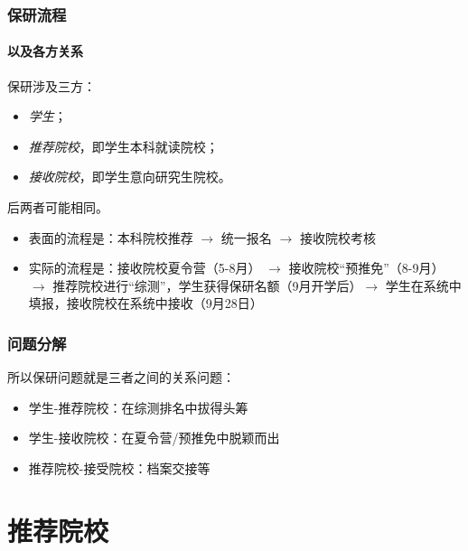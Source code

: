\begin{frame}
	\frametitle{保研流程}
	\framesubtitle{以及各方关系}
	保研涉及三方：

	\begin{itemize}
		\item \emph{学生}；
		\item \emph{推荐院校}，即学生本科就读院校；
		\item \emph{接收院校}，即学生意向研究生院校。
	\end{itemize}
	后两者可能相同。

	\begin{itemize}
		\item 表面的流程是：本科院校推荐 $\rightarrow$ 统一报名 $\rightarrow$ 接收院校考核
		\item 实际的流程是：接收院校夏令营（5-8月） $\rightarrow$ 接收院校``预推免''（8-9月）$\rightarrow$ 推荐院校进行``综测''，学生获得保研名额（9月开学后）$\rightarrow$ 学生在系统中填报，接收院校在系统中接收（9月28日）
	\end{itemize}
\end{frame}

\begin{frame}
	\frametitle{问题分解}
	所以保研问题就是三者之间的关系问题：
	\begin{itemize}
		\item 学生-推荐院校：在综测排名中拔得头筹
		\item 学生-接收院校：在夏令营/预推免中脱颖而出
		\item 推荐院校-接受院校：档案交接等
	\end{itemize}
\end{frame}

\section{推荐院校}

